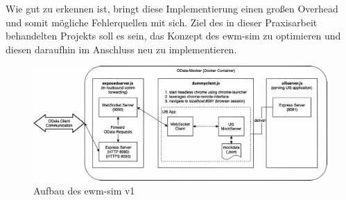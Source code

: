 Wie gut zu erkennen ist, bringt diese Implementierung einen großen Overhead und somit mögliche Fehlerquellen mit sich. Ziel des in dieser Praxisarbeit behandelten Projekts soll es sein, das Konzept des \ac{ewm-sim} zu optimieren und diesen daraufhin im Anschluss neu zu implementieren.

\begin{figure}
    \centering
    \includegraphics[width=\textwidth]{Bilder/ewm-sim_v1_4x.pdf}
    \caption{Aufbau des ewm-sim v1}
    \label{fig:ewm-sim-v1}
\end{figure}